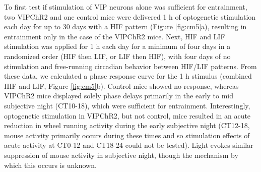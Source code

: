 To first test if stimulation of VIP neurons alone was sufficient for entrainment, two VIPChR2 and one control mice were delivered 1 h of optogenetic stimulation each day for up to 30 days with a HIF pattern (Figure \ref{fig:cm5}a), resulting in entrainment only in the case of the VIPChR2 mice.
Next, HIF and LIF stimulation was applied for 1 h each day for a minimum of four days in a randomized order (HIF then LIF, or LIF then HIF), with four days of no stimulation and free-running circadian behavior between HIF/LIF patterns.
From these data, we calculated a phase response curve for the 1 h stimulus (combined HIF and LIF, Figure \ref{fig:cm5}b).
Control mice showed no response, whereas VIPChR2 mice displayed solely phase delays primarily in the early to mid subjective night (CT10-18), which were sufficient for entrainment.
Interestingly, optogenetic stimulation in VIPChR2, but not control, mice resulted in an acute reduction in wheel running activity during the early subjective night (CT12-18, mouse activity primarily occurs during these times and so stimulation effects of acute activity at CT0-12 and CT18-24 could not be tested).
Light evokes similar suppression of mouse activity in subjective night, though the mechanism by which this occurs is unknown.

